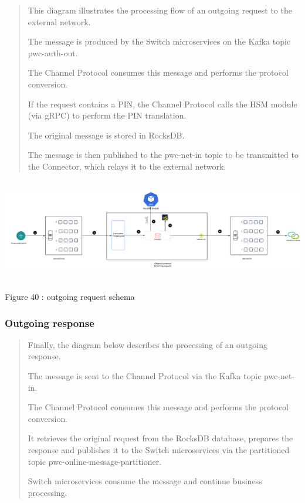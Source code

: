 \documentclass[12pt,a4paper]{report}
\begin{document}
\begin{quote}
This diagram illustrates the processing flow of an outgoing request to
the external network.

The message is produced by the Switch microservices on the Kafka topic
pwc-auth-out.

The Channel Protocol consumes this message and performs the protocol
conversion.

If the request contains a PIN, the Channel Protocol calls the HSM module
(via gRPC) to perform the PIN translation.

The original message is stored in RocksDB.

The message is then published to the pwc-net-in topic to be transmitted
to the Connector, which relays it to the external network.
\end{quote}

\includegraphics[width=6.79462in,height=1.77023in]{vertopal_d1b0b2209edd4c6aa8254f57daa0953b/media/image59.png}

\protect\hypertarget{_Toc201954516}{}{}Figure 40 : outgoing request
schema

\hypertarget{outgoing-response-1}{%
\subsubsection{\texorpdfstring{\textbf{Outgoing
response}}{Outgoing response}}\label{outgoing-response-1}}

\begin{quote}
Finally, the diagram below describes the processing of an outgoing
response.

The message is sent to the Channel Protocol via the Kafka topic
pwc-net-in.

The Channel Protocol consumes this message and performs the protocol
conversion.

It retrieves the original request from the RocksDB database, prepares
the response and publishes it to the Switch microservices via the
partitioned topic pwc-online-message-partitioner.

Switch microservices consume the message and continue business
processing.
\end{quote}
\end{document}

